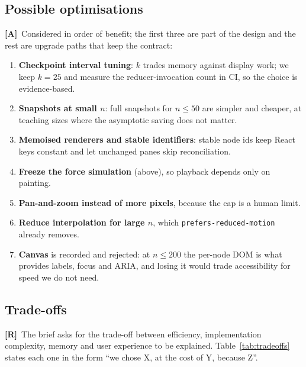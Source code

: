 \documentclass[11pt,a4paper]{article}
\newcommand{\R}{\textcolor{reqc}{\textbf{[R]}}}     %
\newcommand{\A}{\textcolor{asmc}{\textbf{[A]}}}     %
\newcommand{\ct}[1]{\texttt{#1}}
\begin{document}
\subsection{Possible optimisations}

\A\ Considered in order of benefit; the first three are part of the design and the rest are
upgrade paths that keep the contract:

\begin{enumerate}[leftmargin=1.6em,topsep=2pt,itemsep=1pt]
  \item \textbf{Checkpoint interval tuning}: $k$ trades memory against display work; we keep
        $k=25$ and measure the reducer-invocation count in CI, so the choice is evidence-based.
  \item \textbf{Snapshots at small $n$}: full snapshots for $n \le 50$ are simpler and cheaper,
        at teaching sizes where the asymptotic saving does not matter.
  \item \textbf{Memoised renderers and stable identifiers}: stable node ids keep React keys
        constant and let unchanged panes skip reconciliation.
  \item \textbf{Freeze the force simulation} (above), so playback depends only on painting.
  \item \textbf{Pan-and-zoom instead of more pixels}, because the cap is a human limit.
  \item \textbf{Reduce interpolation for large $n$}, which \ct{prefers-reduced-motion} already
        removes.
  \item \textbf{Canvas} is recorded and rejected: at $n \le 200$ the per-node DOM is what
        provides labels, focus and ARIA, and losing it would trade accessibility for speed we do
        not need.
\end{enumerate}

\subsection{Trade-offs}

\R\ The brief asks for the trade-off between efficiency, implementation complexity, memory and
user experience to be explained. Table~\ref{tab:tradeoffs} states each one in the form
``we chose X, at the cost of Y, because Z''.
\end{document}

